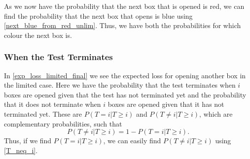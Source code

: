 As we now have the probability that the next box that is opened is red, we can find the probability that the next box that opens is blue using \eqref{next_blue_from_red_unlim}. Thus, we have both the probabilities for which colour the next box is. 



\subsubsection{When the Test Terminates}
In \eqref{exp_loss_limited_final} we see the expected loss for opening another box in the limited case. Here we have the probability that the test terminates when $i$ boxes are opened given that the test has not terminated yet and the probability that it does not terminate when $i$ boxes are opened given that it has not terminated yet. 
These are $P(T=i|T\geq i)$ and $P(T\neq i|T\geq i)$, which are complementary probabilities, such that
\begin{equation}
\label{T_neq_i}
    P(T \neq i|T\geq i) = 1-P(T=i|T\geq i).
\end{equation}
Thus, if we find $P(T=i|T\geq i)$, we can easily find $P(T\neq i|T\geq i)$ using \eqref{T_neq_i}. 

